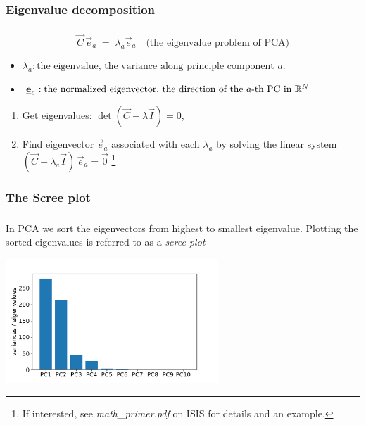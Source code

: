 \subsubsection{Eigenvalue decomposition}

\begin{frame}\frametitle{\subsubsecname}

\begin{equation}
\vec C \, \vec e_a \; = \; \lambda_a \vec e_a  \quad\text{(the eigenvalue problem of PCA)}
\end{equation}

\begin{itemize}
\item[] $\lambda_a: \text{the eigenvalue, the variance along principle component } a.$
\item[] $\underline{\mathbf{e}}_a: \text{the normalized eigenvector, the direction of the } a\text{-th PC in } \mathbb{R}^N$
\end{itemize}


\pause

\begin{enumerate}
\item Get eigenvalues: $\det(\vec C-\lambda \vec I) = 0$, 
\item Find eigenvector $\vec e_a$ associated with each $\lambda_a$ by solving the linear system\\
$ (\vec C - \lambda_a \vec I )\, \vec e_a = \vec 0$
\footnote{If interested, see {\emph{math\_primer.pdf} on ISIS} for details and an example.}
\end{enumerate}

\end{frame}

\subsubsection{The Scree plot}

\begin{frame}\frametitle{\subsubsecname}

In PCA we sort the eigenvectors from highest to smallest eigenvalue.
Plotting the sorted eigenvalues is referred to as a \emph{scree plot}

\begin{center}
\includegraphics[width=0.6\textwidth]{img/screeplot_kpca_poly_d3}%
\end{center}

\end{frame}

